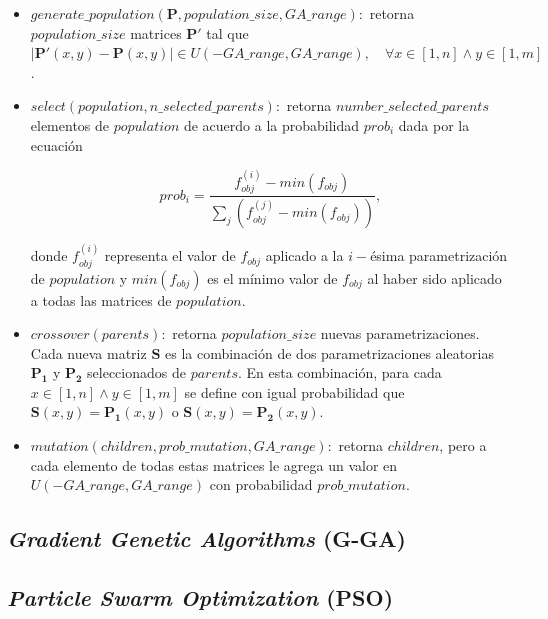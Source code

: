 \begin{itemize}
    \item $generate\_population(\boldsymbol{P}, population\_size, GA\_range):$ 
      retorna $population\_size$ matrices 
      $\boldsymbol{P'}$ tal que 
      $|\boldsymbol{P'}(x, y) - \boldsymbol{P}(x, y)| \in U(-GA\_range, GA\_range), \quad \forall x \in [1, n]
      \land y \in [1, m]$.

    \item $select(population, n\_selected\_parents):$ 
      retorna $number\_selected\_parents$ elementos de $population$ de
      acuerdo a la probabilidad $prob_i$ dada por la ecuación
    
    \begin{equation}
      prob_i = \frac{f_{obj}^{(i)} - min(f_{obj})}{\displaystyle\sum_{j} (f_{obj}^{(j)} - min(f_{obj}))},
    \label{eq:prob}
    \end{equation}
    
    donde $f_{obj}^{(i)}$ representa el valor de $f_{obj}$ aplicado a la 
    $i-$ésima parametrización de $population$ y $min(f_{obj})$ es el mínimo
    valor de $f_{obj}$ al haber sido aplicado a todas las matrices de $population$.
    
    \item $crossover(parents):$ 
    retorna $population\_size$ nuevas parametrizaciones.
    Cada nueva matriz $\boldsymbol{S}$ es la combinación de dos parametrizaciones aleatorias 
    $\boldsymbol{P_1}$ y $\boldsymbol{P_2}$ seleccionados de $parents$.
    En esta combinación, para cada $x \in [1, n] \land y \in [1, m]$ se define 
    con igual probabilidad que
    $\boldsymbol{S}(x, y) = \boldsymbol{P_1}(x, y)$ o
    $\boldsymbol{S}(x, y) = \boldsymbol{P_2}(x, y)$.

    \item $mutation(children, prob\_mutation, GA\_range):$ 
      retorna $children$, pero
      a cada elemento de todas estas matrices
      le agrega un valor en $U(-GA\_range, GA\_range)$ con
      probabilidad $prob\_mutation$.

\end{itemize}

\subsection{\emph{Gradient Genetic Algorithms} (G-GA)}


\subsection{\emph{Particle Swarm Optimization} (PSO)}

